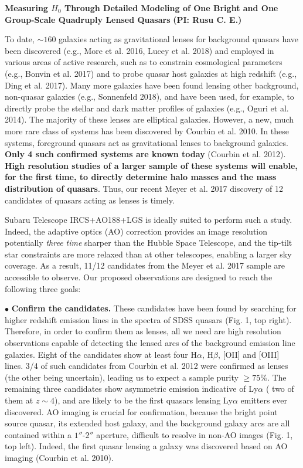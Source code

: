 \documentclass[a4paper,11pt]{article}
\begin{document}
\begin {centering}
{\bf Measuring $H_0$ Through Detailed Modeling of One Bright and One Group-Scale Quadruply Lensed Quasars} {\bf (PI: Rusu C. E.)}\\
 \end{centering}
 
\medskip

To date, $\sim160$ galaxies acting as gravitational lenses for background quasars have been discovered (e.g., More et al. 2016, Lucey et al. 2018) and employed in various areas of active research, such as to constrain cosmological parameters (e.g., Bonvin et al. 2017) and to probe quasar host galaxies at high redshift (e.g., Ding et al. 2017). Many more galaxies have been found lensing other background, non-quasar galaxies (e.g., Sonnenfeld 2018), and have been used, for example, to directly probe the stellar and dark matter profiles of galaxies (e.g., Oguri et al. 2014). The majority of these lenses are elliptical galaxies. However, a new, much more rare class of systems has been discovered by Courbin et al. 2010. In these systems, foreground quasars act as gravitational lenses to background galaxies. {\bf Only 4 such confirmed systems are known today} (Courbin et al. 2012). {\bf High resolution studies of a larger sample of these systems will enable, for the first time, to directly determine halo masses and the mass distribution of quasars}. Thus, our recent Meyer et al. 2017 discovery  of 12 candidates of quasars acting as lenses is timely. 

Subaru Telescope IRCS+AO188+LGS is ideally suited to perform such a study. Indeed, the adaptive optics (AO) correction provides an image resolution potentially {\it three time} sharper than the Hubble Space Telescope, and the tip-tilt star constraints are more relaxed than at other telescopes, enabling a larger sky coverage. As a result, 11/12 candidates from the Meyer et al. 2017 sample are accessible to observe. Our proposed observations are designed to reach the following three goals:

$\bullet$ {\bf Confirm the candidates.} These candidates have been found by searching for higher redshift emission lines in the spectra of SDSS quasars (Fig. 1, top right). Therefore, in order to confirm them as lenses, all we need are high resolution observations capable of detecting the lensed arcs of the background emission line galaxies. Eight of the candidates show at least four H$\alpha$, H$\beta$, [OII] and [OIII] lines. 3/4 of such candidates from Courbin et al. 2012 were confirmed as lenses (the other being uncertain), leading us to expect a sample purity $\geq75\%$. The remaining three candidates show asymmetric emission indicative of Ly$\alpha$ ( two of them at $z\sim4$), and are likely to be the first quasars lensing Ly$\alpha$ emitters ever discovered. AO imaging is crucial for confirmation, because the bright point source quasar, its extended host galaxy, and the background galaxy arcs are all contained within a $1''$-$2''$ aperture, difficult to resolve in non-AO images (Fig. 1, top left). Indeed, the first quasar lensing a galaxy was discovered based on AO imaging (Courbin et al. 2010).
\end{document}
